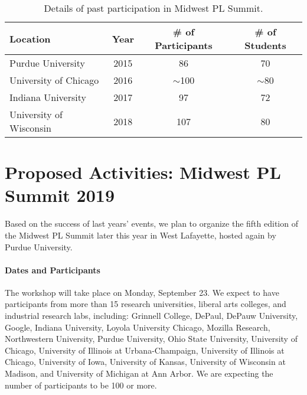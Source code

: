 \documentclass[11pt]{article}
\newcommand{\parahead}[1]{\paragraph{#1}}
\begin{document}
\begin{table}[hb]
\centering
\begin{tabular}{lccc}
{\bf Location} & {\bf Year} & {\bf \# of Participants} & {\bf \# of Students} \\
\hline
Purdue University & 2015 & 86 & 70\\
University of Chicago & 2016 & $\sim$100 & $\sim$80\\
Indiana University & 2017 & 97 & 72\\
University of Wisconsin & 2018 & 107 & 80
\end{tabular}
\caption{Details of past participation in Midwest PL Summit.}
\label{tab:participants}
\end{table}



\section{Proposed Activities: Midwest PL Summit 2019}

Based on the success of last years' events, we plan to organize the
fifth edition of the Midwest PL Summit later this year in West Lafayette, hosted again by Purdue University.

\parahead{Dates and Participants}

The workshop will take place on Monday, September 23.
We expect to have participants
from more than 15 research universities, liberal arts colleges, and
industrial research labs, including:
Grinnell College,
DePaul,
DePauw University,
Google,
Indiana University,
Loyola University Chicago,
Mozilla Research,
Northwestern University,
Purdue University,
Ohio State University,
University of Chicago,
University of Illinois at Urbana-Champaign,
University of Illinois at Chicago,
University of Iowa,
University of Kansas,
University of Wisconsin at Madison, and
University of Michigan at Ann Arbor.
We are expecting the number
of participants to be 100 or more.
\end{document}
